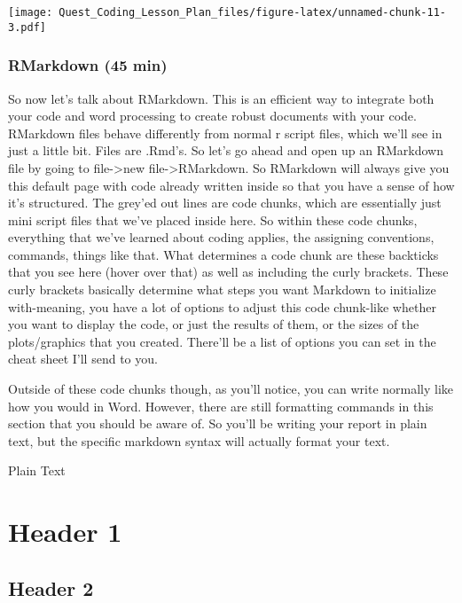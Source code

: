\documentclass[
]{article}
\begin{document}
\texttt{[image: Quest\_Coding\_Lesson\_Plan\_files/figure-latex/unnamed-chunk-11-3.pdf]}

\hypertarget{rmarkdown-45-min}{%
\subsubsection{RMarkdown (45 min)}\label{rmarkdown-45-min}}

So now let's talk about RMarkdown. This is an efficient way to integrate
both your code and word processing to create robust documents with your
code. RMarkdown files behave differently from normal r script files,
which we'll see in just a little bit. Files are .Rmd's. So let's go
ahead and open up an RMarkdown file by going to file-\textgreater new
file-\textgreater RMarkdown. So RMarkdown will always give you this
default page with code already written inside so that you have a sense
of how it's structured. The grey'ed out lines are code chunks, which are
essentially just mini script files that we've placed inside here. So
within these code chunks, everything that we've learned about coding
applies, the assigning conventions, commands, things like that. What
determines a code chunk are these backticks that you see here (hover
over that) as well as including the curly brackets. These curly brackets
basically determine what steps you want Markdown to initialize
with-meaning, you have a lot of options to adjust this code chunk-like
whether you want to display the code, or just the results of them, or
the sizes of the plots/graphics that you created. There'll be a list of
options you can set in the cheat sheet I'll send to you.

Outside of these code chunks though, as you'll notice, you can write
normally like how you would in Word. However, there are still formatting
commands in this section that you should be aware of. So you'll be
writing your report in plain text, but the specific markdown syntax will
actually format your text.

Plain Text

\hypertarget{header-1}{%
\section{Header 1}\label{header-1}}

\hypertarget{header-2}{%
\subsection{Header 2}\label{header-2}}
\end{document}
